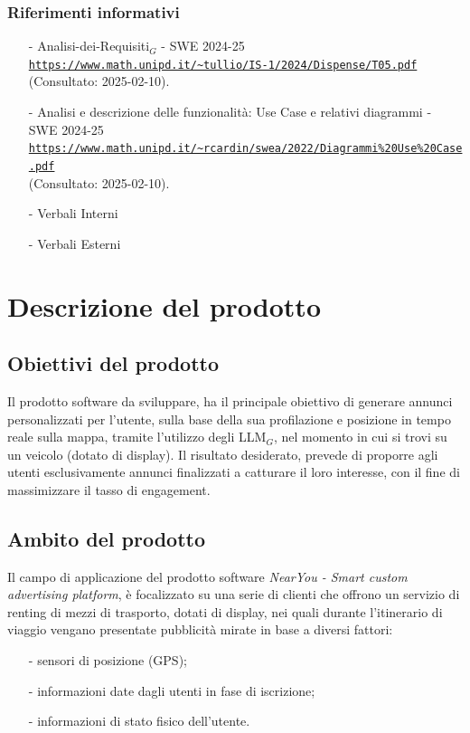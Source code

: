 \documentclass[10pt]{article}
\begin{document}
\begin{justify}
\begin{itemize}
\end{itemize}
\subsubsection{Riferimenti informativi}
\begin{itemize}
    \item[-] Analisi-dei-Requisiti$_G$ - SWE 2024-25\\
    \textcolor{blue}{\texttt{\url{https://www.math.unipd.it/~tullio/IS-1/2024/Dispense/T05.pdf}}}\\ (Consultato: 2025-02-10).
    \item[-] Analisi e descrizione delle funzionalità: Use Case e relativi diagrammi - SWE 2024-25\\    
    \textcolor{blue}{\texttt{\url{https://www.math.unipd.it/~rcardin/swea/2022/Diagrammi\%20Use\%20Case.pdf}}}\\ (Consultato: 2025-02-10).
    \item[-] Verbali Interni
    \item[-] Verbali Esterni
\end{itemize}

\newpage
\section{Descrizione del prodotto}
\label{sec:descrizione}
\subsection{Obiettivi del prodotto}
Il prodotto software da sviluppare, ha il principale obiettivo di generare annunci personalizzati per l'utente, sulla base della sua profilazione e posizione in tempo reale sulla mappa, tramite l'utilizzo degli LLM$_G$, nel momento in cui si trovi su un veicolo (dotato di display). Il risultato desiderato, prevede di proporre agli utenti esclusivamente annunci finalizzati a catturare il loro interesse, con il fine di massimizzare il tasso di engagement.

\subsection{Ambito del prodotto}
Il campo di applicazione del prodotto software \textit{NearYou - 
Smart custom advertising platform}, è focalizzato su una serie di clienti che offrono un servizio di renting di mezzi di trasporto, dotati di display, nei quali durante l'itinerario di viaggio vengano presentate pubblicità mirate in base a diversi fattori:
\begin{itemize}
    \item [-] sensori di posizione (GPS);
    \item [-] informazioni date dagli utenti in fase di iscrizione;
    \item [-] informazioni di stato fisico dell’utente.
\end{itemize}


\end{justify}
\end{document}
